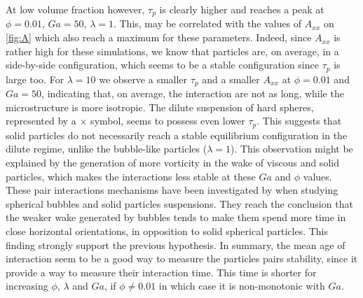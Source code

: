 At low volume fraction however, $\tau_p$ is clearly higher and reaches a peak at $\phi=0.01$, $Ga=50$, $\lambda=1$.
This, may be correlated with the values of $A_{xx}$ on \ref{fig:A} which also reach a maximum for these parameters. 
Indeed, since $A_{xx}$ is rather high for these simulations, we know that particles are, on average, in a side-by-side configuration, which seems to be a stable configuration since $\tau_p$ is large too.
For $\lambda = 10$ we observe a smaller $\tau_p$ and a smaller $A_{xx}$ at $\phi = 0.01$ and $Ga = 50$, indicating that, on average, the interaction are not as long, while the microstructure is more isotropic. 
The dilute suspension of hard spheres, represented by a $\pmb\times$ symbol, seems to possess even lower $\tau_p$. 
This suggests that solid particles do not necessarily reach a stable equilibrium configuration in the dilute regime, unlike the bubble-like particles ($\lambda = 1$). 
This observation might be explained by the generation of more vorticity in the wake of viscous and solid particles, which makes the interactions less stable at these $Ga$ and $\phi$ values.
These pair interactions mechanisms have been investigated by \citet{yin2008lattice} when studying spherical bubbles and solid particles suspensions.
They reach the conclusion that the weaker wake generated by bubbles tends to make them spend more time in close horizontal orientations, in opposition to solid spherical particles. 
This finding strongly support the previous hypothesis. 
In summary, the mean age of interaction seem to be a good way to measure the particles pairs stability, since it provide a way to measure their interaction time. 
This time is shorter for increasing $\phi$, $\lambda$ and $Ga$, if $\phi \neq 0.01$ in which case it is non-monotonic with $Ga$. 


